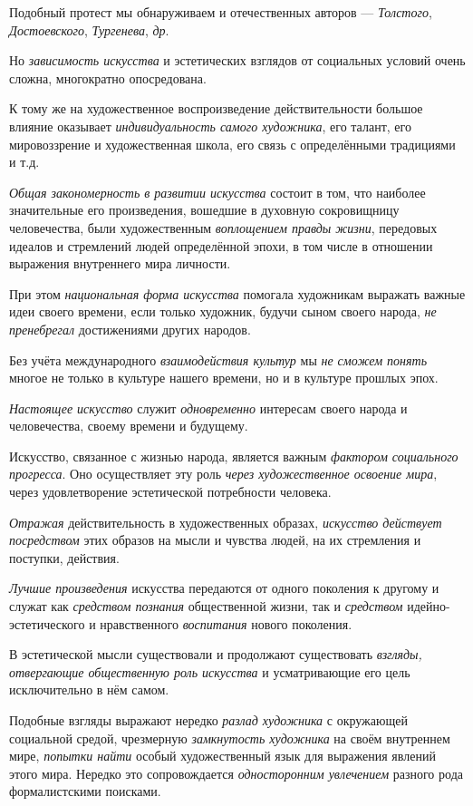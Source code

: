 \documentclass[a4paper,14pt,russian]{extreport}
\begin{document}
Подобный протест мы обнаруживаем и отечественных авторов --- \emph{Толстого}, \emph{Достоевского}, \emph{Тургенева}, \emph{др}.

Но \emph{зависимость искусства} и эстетических взглядов от социальных условий очень сложна, многократно опосредована.

К тому же на художественное воспроизведение действительности большое влияние оказывает \emph{индивидуальность самого художника}, его талант, его мировоззрение и художественная школа, его связь с определёнными традициями и т.д.

\emph{Общая закономерность в развитии искусства} состоит в том, что наиболее значительные его произведения, вошедшие в духовную сокровищницу человечества, были художественным \emph{воплощением правды жизни}, передовых идеалов и стремлений людей определённой эпохи, в том числе в отношении выражения внутреннего мира личности.

При этом \emph{национальная форма искусства} помогала художникам выражать важные идеи своего времени, если только художник, будучи сыном своего народа, \emph{не пренебрегал} достижениями других народов.

Без учёта международного \emph{взаимодействия культур} мы \emph{не сможем понять} многое не только в культуре нашего времени, но и в культуре прошлых эпох.

\emph{Настоящее искусство} служит \emph{одновременно} интересам своего народа и человечества, своему времени и будущему.

Искусство, связанное с жизнью народа, является важным \emph{фактором социального прогресса}. Оно осуществляет эту роль \emph{через художественное освоение мира}, через удовлетворение эстетической потребности человека.

\emph{Отражая} действительность в художественных образах, \emph{искусство действует посредством} этих образов на мысли и чувства людей, на их стремления и поступки, действия.

\emph{Лучшие произведения} искусства передаются от одного поколения к другому и служат как \emph{средством познания} общественной жизни, так и \emph{средством} идейно-эстетического и нравственного \emph{воспитания} нового поколения.

В эстетической мысли существовали и продолжают существовать \emph{взгляды,} \emph{отвергающие общественную роль искусства} и усматривающие его цель исключительно в нём самом.

Подобные взгляды выражают нередко \emph{разлад художника} с окружающей социальной средой, чрезмерную \emph{замкнутость художника} на своём внутреннем мире, \emph{попытки найти} особый художественный язык для выражения явлений этого мира. Нередко это сопровождается \emph{односторонним увлечением} разного рода формалистскими поисками.
\end{document}
